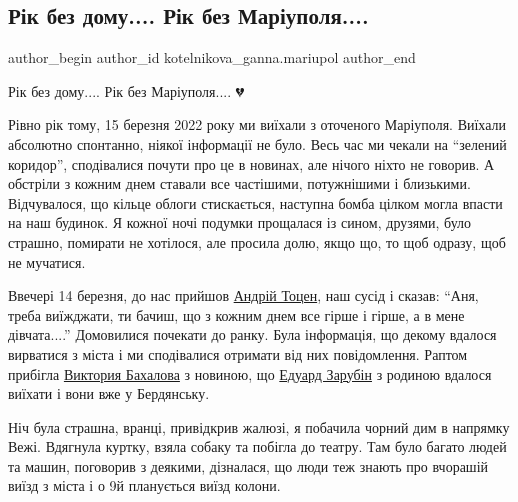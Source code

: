  
 
 
 
 

\subsection{Рік без дому.... Рік без Маріуполя....}
\label{sec:16_03_2023.fb.kotelnikova_ganna.mariupol.1.r_k_bez_domu__r_k_be}

\ifcmt
 author_begin
   author_id kotelnikova_ganna.mariupol
 author_end
\fi

Рік без дому....    Рік без Маріуполя.... 💔

Рівно рік тому, 15 березня 2022 року ми виїхали з оточеного Маріуполя.
Виїхали абсолютно спонтанно, ніякої інформації не було. Весь час ми чекали на
\enquote{зелений коридор}, сподівалися почути про це в новинах, але нічого ніхто не
говорив. А обстріли з кожним днем ставали все частішими, потужнішими і
близькими.  Відчувалося, що кільце  облоги стискається, наступна бомба цілком
могла впасти на наш будинок. Я кожної ночі подумки прощалася із сином, друзями,
було страшно, помирати не хотілося, але просила долю, якщо що, то щоб одразу,
щоб не мучатися.

Ввечері 14 березня, до нас прийшов
\href{https://www.facebook.com/andriytotsen}{Андрій Тоцен}, наш сусід і сказав:
\enquote{Аня, треба виїжджати, ти бачиш, що з кожним днем все гірше і гірше, а
в мене дівчата....} Домовилися почекати до ранку. Була інформація, що декому
вдалося вирватися з міста і ми сподівалися отримати від них повідомлення.
Раптом прибігла
\href{https://www.facebook.com/profile.php?id=100004955686404}{Виктория
Бахалова}  з новиною, що \href{https://www.facebook.com/edwazar}{Едуард Зарубін}
з родиною вдалося виїхати і вони вже у Бердянську. 

Ніч була страшна, вранці, привідкрив жалюзі, я побачила чорний дим в напрямку
Вежі. Вдягнула куртку, взяла собаку та побігла до театру. Там було багато
людей та машин, поговорив з деякими, дізналася, що люди теж знають  про
вчорашій виїзд з міста і о 9й планується виїзд колони.  

